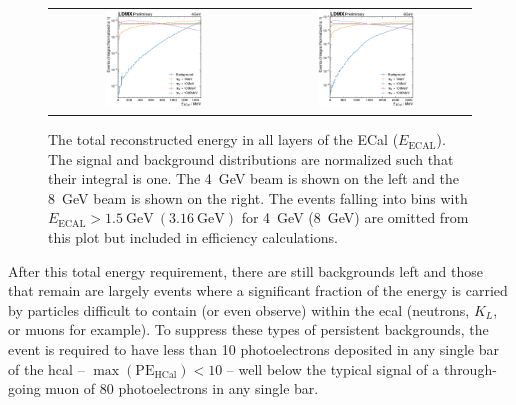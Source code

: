 \begin{figure}[htb]
    \centering
    \begin{tabular}{cc}
         \includegraphics[width=0.48\textwidth]{figures/ldmx/analysis/energy-after-trigger-4gev.pdf}
         &
         \includegraphics[width=0.48\textwidth]{figures/ldmx/analysis/energy-after-trigger-8gev.pdf}
    \end{tabular}
    \caption{
    The total reconstructed energy in all layers of the ECal ($E_\text{ECAL}$).
    The signal and background distributions are normalized such that their integral is one.
    The \qty{4}{\GeV} beam is shown on the left and the \qty{8}{\GeV} beam is shown
    on the right.
    The events falling into bins with $E_\text{ECAL} > \qty{1.5}{\GeV}~(\qty{3.16}{\GeV})$
    for \qty{4}{\GeV} (\qty{8}{GeV}) are omitted from this plot but included in efficiency calculations.
    }
    \label{fig:energy-after-trigger}
\end{figure}

After this total energy requirement, there are still backgrounds left and those that remain are largely
events where a significant fraction of the energy is carried by particles difficult to contain (or even observe)
within the \ac{ecal} (neutrons, $K_L$, or muons for example).
To suppress these types of persistent backgrounds, the event is required to have less than 10 photoelectrons
deposited in any single bar of the \ac{hcal} -- $\max(\mathrm{PE}_\mathrm{HCal}) < 10$ --
well below the typical signal of a through-going muon of 80 photoelectrons in any single bar.

